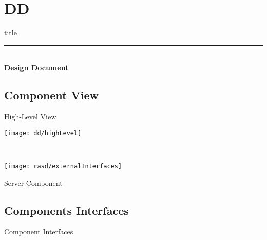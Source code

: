 \section{DD}

	\begin{frame}[plain]
		\vfill
		\centering
		\begin{beamercolorbox}[sep=8pt,center,shadow=true,rounded=true]{title}
			\textbf{\insertsectionhead}\par%
			\color{polimiblue}\noindent\rule{10cm}{1pt} \\
			\textbf{Design Document}
		\end{beamercolorbox}
		\vfill
	\end{frame}

	\subsection{Component View}
		\begin{frame}{High-Level View}
			
			\begin{minipage}{0.4\textwidth}
				\centering
				\texttt{[image: dd/highLevel]}	
			\end{minipage}\hspace{2.5cm}
			~
			\begin{minipage}{0.2\textwidth}
				\vspace{-6cm}
				\centering
				\texttt{[image: rasd/externalInterfaces]}
			\end{minipage}
			
		\end{frame}
	

	
		\begin{frame}{Server Component}
			\noindent{}
		\end{frame}
	
	\subsection{Components Interfaces}
		\begin{frame}{Component Interfaces}
			\vspace{-6pt}
			\noindent{}
		\end{frame}
	
